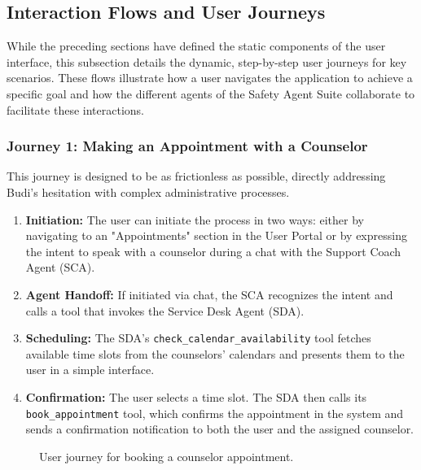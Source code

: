 \subsection{Interaction Flows and User Journeys}

While the preceding sections have defined the static components of the user interface, this subsection details the dynamic, step-by-step user journeys for key scenarios. These flows illustrate how a user navigates the application to achieve a specific goal and how the different agents of the Safety Agent Suite collaborate to facilitate these interactions.

\subsubsection{Journey 1: Making an Appointment with a Counselor}
This journey is designed to be as frictionless as possible, directly addressing Budi's hesitation with complex administrative processes.
\begin{enumerate}
    \item \textbf{Initiation:} The user can initiate the process in two ways: either by navigating to an "Appointments" section in the User Portal or by expressing the intent to speak with a counselor during a chat with the Support Coach Agent (SCA).
    \item \textbf{Agent Handoff:} If initiated via chat, the SCA recognizes the intent and calls a tool that invokes the Service Desk Agent (SDA).
    \item \textbf{Scheduling:} The SDA's \texttt{check\_calendar\_availability} tool fetches available time slots from the counselors' calendars and presents them to the user in a simple interface.
    \item \textbf{Confirmation:} The user selects a time slot. The SDA then calls its \texttt{book\_appointment} tool, which confirms the appointment in the system and sends a confirmation notification to both the user and the assigned counselor.
\end{enumerate}

\begin{figure}[h]
    \centering
    \caption{User journey for booking a counselor appointment.}
    \label{fig:journey_appointment}
\end{figure}

